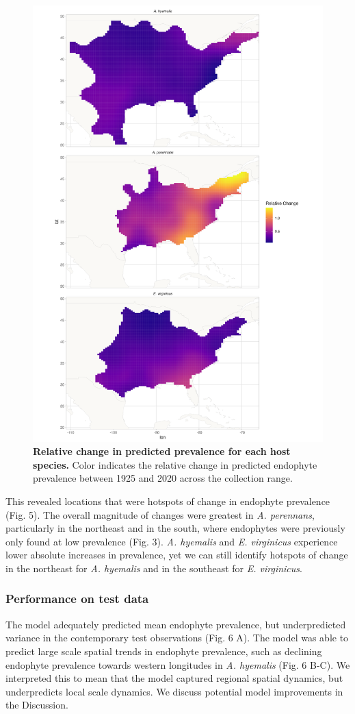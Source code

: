 \documentclass[11pt]{article}
\begin{document}
\begin{figure}[H]
	\label{fig:rel_change_plot}
	\centering
	\includegraphics[width = .8\linewidth]{rel_change_plot.png}
	\caption{\textbf{Relative change in predicted prevalence for each host species.} Color indicates the relative change in predicted endophyte prevalence between 1925 and 2020 across the collection range.}
\end{figure}

This revealed locations that were hotspots of change in endophyte prevalence (Fig. 5). 
The overall magnitude of changes were greatest in \emph{A. perennans}, particularly in the northeast and in the south, where endophytes were previously only found at low prevalence (Fig. 3).
\emph{A. hyemalis} and \emph{E. virginicus} experience lower absolute increases in prevalence, yet we can still identify hotspots of change in the northeast for \emph{A. hyemalis} and in the southeast for \emph{E. virginicus}.


\subsubsection*{Performance on test data}
The model adequately predicted mean endophyte prevalence, but underpredicted variance in the contemporary test observations (Fig. 6 A).
The model was able to predict large scale spatial trends in endophyte prevalence, such as declining endophyte prevalence towards western longitudes in \emph{A. hyemalis} (Fig. 6 B-C).
We interpreted this to mean that the model captured regional spatial dynamics, but underpredicts local scale dynamics. We discuss potential model improvements in the Discussion.
\end{document}
